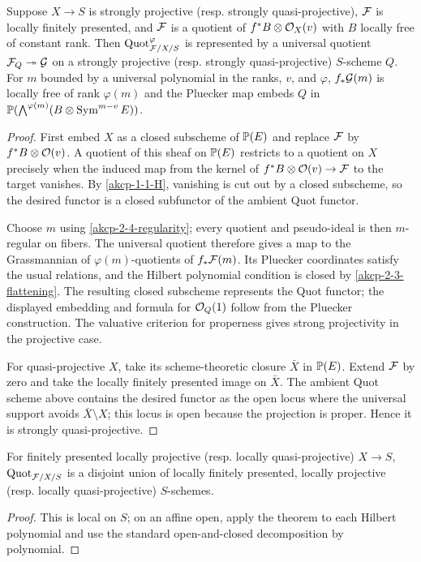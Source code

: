 \begin{theorem}
\label{akcp-2-6-quot-representability}
Suppose $X\to S$ is strongly projective (resp. strongly quasi-projective),
$\mathcal F$ is locally finitely presented, and $\mathcal F$ is a quotient of
$f^*B\otimes\mathcal O_X(v)$ with $B$ locally free of constant rank.  Then
$\operatorname{Quot}^{\varphi}_{\mathcal F/X/S}$ is represented by a universal quotient
$\mathcal F_Q\twoheadrightarrow\mathcal G$ on a strongly projective (resp. strongly
quasi-projective) $S$-scheme $Q$.  For $m$ bounded by a universal polynomial in
the ranks, $v$, and $\varphi$, $f_*\mathcal G(m)$ is locally free of rank $\varphi(m)$
and the Pluecker map embeds $Q$ in
$\mathbb P(\bigwedge^{\varphi(m)}(B\otimes\operatorname{Sym}^{m-v}E))$.
\end{theorem}
\begin{proof}
First embed $X$ as a closed subscheme of $\mathbb P(E)$ and replace $\mathcal F$ by
$f^*B\otimes\mathcal O(v)$.  A quotient of this sheaf on $\mathbb P(E)$ restricts to a
quotient on $X$ precisely when the induced map from the kernel of
$f^*B\otimes\mathcal O(v)\to\mathcal F$ to the target vanishes.  By
\cref{akcp-1-1-H}, vanishing is cut out by a closed subscheme, so the desired
functor is a closed subfunctor of the ambient Quot functor.

Choose $m$ using \cref{akcp-2-4-regularity}; every quotient and pseudo-ideal
is then $m$-regular on fibers.  The universal quotient therefore gives a map
to the Grassmannian of $\varphi(m)$-quotients of $f_*\mathcal F(m)$.  Its Pluecker
coordinates satisfy the usual relations, and the Hilbert polynomial condition
is closed by \cref{akcp-2-3-flattening}.  The resulting closed subscheme
represents the Quot functor; the displayed embedding and formula for
$\mathcal O_Q(1)$ follow from the Pluecker construction.  The valuative criterion for
properness gives strong projectivity in the projective case.

For quasi-projective $X$, take its scheme-theoretic closure $\bar X$ in
$\mathbb P(E)$.  Extend $\mathcal F$ by zero and take the locally finitely presented image
on $\bar X$.  The ambient Quot scheme above contains the desired functor as
the open locus where the universal support avoids $\bar X\setminus X$; this
locus is open because the projection is proper.  Hence it is strongly
quasi-projective.
\end{proof}

\begin{corollary}
\label{akcp-2-7-local-quot}
For finitely presented locally projective (resp. locally quasi-projective)
$X\to S$, $\operatorname{Quot}_{\mathcal F/X/S}$ is a disjoint union of locally finitely presented,
locally projective (resp. locally quasi-projective) $S$-schemes.
\end{corollary}
\begin{proof}
This is local on $S$; on an affine open, apply the theorem to each Hilbert
polynomial and use the standard open-and-closed decomposition by polynomial.
\end{proof}

